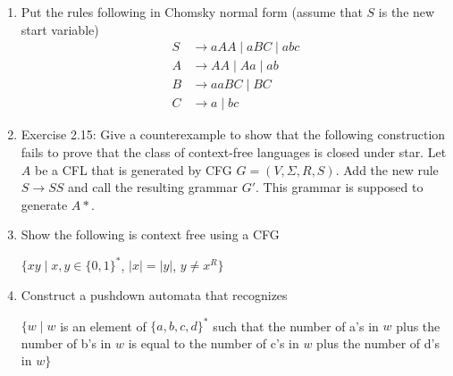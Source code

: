 \documentclass{article}
\begin{document}
\begin{enumerate}
        \item Put the rules following in Chomsky normal form (assume that $S$ is the new start variable)
            \begin{align*}
                S&\rightarrow aAA \mid aBC \mid abc\\
                A&\rightarrow AA \mid Aa \mid ab\\
                B&\rightarrow aaBC \mid BC\\
                C&\rightarrow a\mid bc
            \end{align*}
        
        \item Exercise 2.15: Give a counterexample to show that the following construction fails to prove that the class of context-free languages
            is closed under star. Let $A$ be a CFL that is generated by CFG $G=(V,\Sigma, R,S)$. Add the new rule $S\rightarrow SS$ and call the 
            resulting grammar $G'$. This grammar is supposed to generate $A*$.

        \item Show the following is context free using a CFG
            \begin{center}
                $\{xy \mid x,y\in \{0,1\}^*$, $ |x|=|y|$, $ y\not= x^R\}$
            \end{center}

        \item Construct a pushdown automata that recognizes
            \begin{center}
                $\{w\mid w $ is an element of $\{a,b,c,d\}^* $ such that the number of a's in $w$ plus the number of b's in $w$ is equal to the number of c's in $w$ plus the number of d's in $w \}$
            \end{center}
    \end{enumerate}
\end{document}
